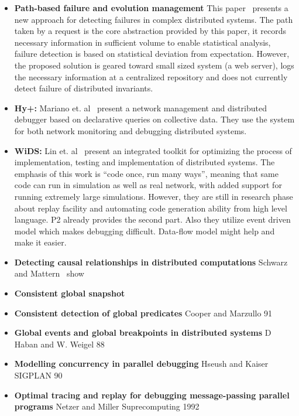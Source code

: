 \documentclass{sig-alt-full}
\begin{document}
{\begin{itemize}
\item{\bf Path-based failure and evolution management} This paper~\cite{chen-path-04} 
presents a new approach for detecting failures in complex distributed systems. The 
path taken by a request is the core abstraction provided by this paper, it 
records necessary information in sufficient volume to enable statistical 
analysis, failure detection is based on statistical deviation from expectation. 
However, the proposed solution is geared toward small sized system (a web server), 
logs the necessary information at a centralized repository and does not 
currently detect failure of distributed invariants.



\item{\bf Hy+:} Mariano et. al~\cite{Hy+} present a network management and 
distributed debugger based on declarative queries on collective data. They 
use the system for both network monitoring and debugging distributed systems.


\item{\bf WiDS:} Lin et. al~\cite{wids-hotos05} present an integrated toolkit 
for optimizing the process of implementation, testing and implementation of 
distributed systems. The emphasis of this work is ``code once, run many ways'', 
meaning that same code can run in simulation as well as real network, with 
added support for running extremely large simulations. However, they are 
still in research phase about replay facility and automating code 
generation ability from high level language. P2 already provides the 
second part. Also they utilize event driven model which makes debugging 
difficult. Data-flow model might help and make it easier.

\item{\bf Detecting causal relationships in distributed computations} 
Schwarz and Mattern~\cite{Schwarz94} show 

\item{\bf Consistent global snapshot}

\item{\bf Consistent detection of global predicates}  Cooper and Marzullo 91

\item{\bf Global events and global breakpoints in distributed systems} D Haban and W. Weigel 88

\item{\bf Modelling concurrency in parallel debugging} Hseush and Kaiser SIGPLAN 90

\item{\bf Optimal tracing and replay for debugging message-passing parallel programs} 
Netzer and Miller Suprecomputing 1992

\end{itemize} 



} %
\end{document}
